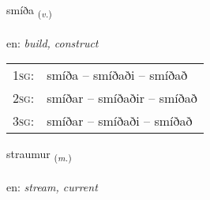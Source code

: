 \documentclass[frontgrid, backgrid]{flacards}\usepackage[]{graphicx}\usepackage[]{color}
\begin{document}
\renewcommand{\flhead}{\vskip5pt \fboxsep=0pt {\small\bfseries\footnotesize Sagnorð | Verb}}
\renewcommand{\fcfoot}{\vskip5pt \fboxsep=0pt \hspace{2pt}{\small\bfseries\footnotesize 2K}}

\renewcommand{\blhead}{\vskip5pt {\small\bfseries\footnotesize Sagnorð | Verb }}
\renewcommand{\bcfoot}{\vskip5pt \hspace{2pt}{\small\bfseries\footnotesize 2K}}


{smíða \small{\textsubscript{(\textit{v.})}} \\[1ex] %
\textphonetic{[smiːða]} \\
en: \emph{build, construct} \\  [2ex]
\renewcommand*{\arraystretch}{0.8}
\begin{tabular}{p{1cm}l}
\textsc{1sg}: & smíða -- smíðaði -- smíðað \\ 
\textsc{2sg}: & smíðar -- smíðaðir -- smíðað \\ 
\textsc{3sg}: & smíðar -- smíðaði -- smíðað \\ 
\end{tabular}
}

\renewcommand{\flhead}{\vskip5pt \fboxsep=0pt {\small\bfseries\footnotesize Nafnorð | Noun}}
\renewcommand{\fcfoot}{\vskip5pt \fboxsep=0pt \hspace{2pt}{\small\bfseries\footnotesize 2K}}

\renewcommand{\blhead}{\vskip5pt {\small\bfseries\footnotesize Nafnorð | Noun }}
\renewcommand{\bcfoot}{\vskip5pt \hspace{2pt}{\small\bfseries\footnotesize 2K}}


{straumur \small{\textsubscript{(\textit{m.})}} \\[1ex] %
\textphonetic{[strœiːmʏr]} \\
en: \emph{stream, current} \\  [2ex]
\renewcommand*{\arraystretch}{0.8}
}
\end{document}
